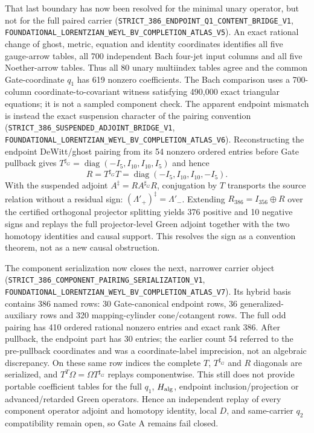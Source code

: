 \documentclass[11pt]{article}
\theoremstyle{definition}
\theoremstyle{remark}
\newcommand{\cert}[1]{\nolinkurl{#1}}
\begin{document}
That last boundary has now been resolved for the minimal unary operator, but
not for the full paired carrier
(\cert{STRICT_386_ENDPOINT_Q1_CONTENT_BRIDGE_V1},
\cert{FOUNDATIONAL_LORENTZIAN_WEYL_BV_COMPLETION_ATLAS_V5}).  An exact rational
change of ghost, metric, equation and identity coordinates identifies all
five gauge-arrow tables, all 700 independent Bach four-jet input columns and
all five Noether-arrow tables.  Thus all 80 unary multiindex tables agree and
the common Gate-coordinate \(q_1\) has 619 nonzero coefficients.  The Bach
comparison uses a 700-column coordinate-to-covariant witness satisfying
490,000 exact triangular equations; it is not a sampled component check.
The apparent endpoint mismatch is instead the exact suspension character of
the pairing convention
(\cert{STRICT_386_SUSPENDED_ADJOINT_BRIDGE_V1},
\cert{FOUNDATIONAL_LORENTZIAN_WEYL_BV_COMPLETION_ATLAS_V6}).  Reconstructing
the endpoint DeWitt/ghost pairing from its 54 nonzero ordered entries before
Gate pullback gives
\(T^{\sharp_G}=\operatorname{diag}(-I_5,I_{10},I_{10},I_5)\) and hence
\[
 R=T^{\sharp_G}T=\operatorname{diag}(-I_5,I_{10},I_{10},-I_5).
\]
With the suspended adjoint \(A^\ddagger=R A^{\sharp_G}R\), conjugation by
\(T\) transports the source relation without a residual sign:
\((\Lambda'_+)^\ddagger=\Lambda'_-\).  Extending
\(R_{386}=I_{356}\mathbin{\oplus}R\) over the certified orthogonal
projector splitting yields 376 positive and 10 negative signs and replays the
full projector-level Green adjoint together with the two homotopy identities
and causal support.  This resolves the sign as a convention theorem, not as
a new causal obstruction.

The component serialization now closes the next, narrower carrier object
(\cert{STRICT_386_COMPONENT_PAIRING_SERIALIZATION_V1},
\cert{FOUNDATIONAL_LORENTZIAN_WEYL_BV_COMPLETION_ATLAS_V7}).  Its hybrid basis
contains 386 named rows: 30 Gate-canonical endpoint rows, 36 generalized-
auxiliary rows and 320 mapping-cylinder cone/cotangent rows.  The full odd
pairing has 410 ordered rational nonzero entries and exact rank 386.  After
pullback, the endpoint part has 30 entries; the earlier count 54 referred to
the pre-pullback coordinates and was a coordinate-label imprecision, not an
algebraic discrepancy.  On these same row indices the complete \(T\),
\(T^{\sharp_G}\) and \(R\) diagonals are serialized, and
\(T^T\Omega=\Omega T^{\sharp_G}\) replays componentwise.  This still does not
provide portable coefficient tables for the full \(q_1\), \(H_{\rm alg}\),
endpoint inclusion/projection or advanced/retarded Green operators.  Hence an
independent replay of every component operator adjoint and homotopy identity,
local \(D\), and same-carrier \(q_2\) compatibility remain open, so Gate A
remains fail closed.
\end{document}
